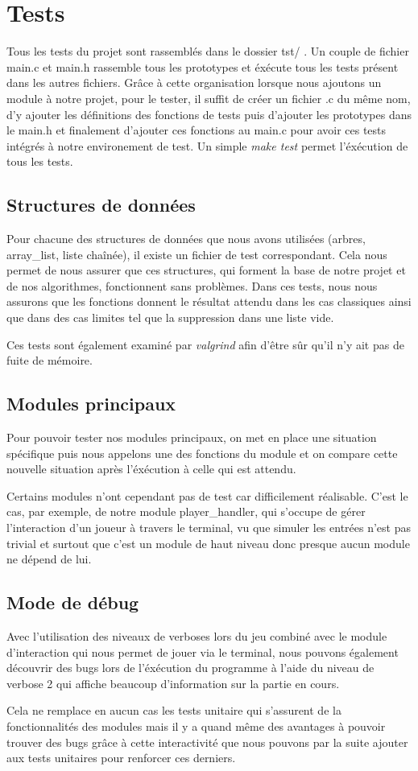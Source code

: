 \section{Tests}

Tous les tests du projet sont rassemblés dans le dossier tst/ . Un couple de fichier main.c et main.h 
rassemble tous les prototypes et éxécute tous les tests présent dans les autres fichiers. Grâce à cette
organisation lorsque nous ajoutons un module à notre projet, pour le tester, il suffit de créer un fichier .c
du même nom, d'y ajouter les définitions des fonctions de tests puis d'ajouter les prototypes dans le main.h et
finalement d'ajouter ces fonctions au main.c pour avoir ces tests intégrés à notre environement de test.
Un simple \emph{make test} permet l'éxécution de tous les tests. 

\subsection{Structures de données}
Pour chacune des structures de données que nous avons utilisées (arbres, array\_list, liste chaînée),
il existe un fichier de test correspondant. Cela nous permet de nous assurer que ces structures, qui
forment la base de notre projet et de nos algorithmes, fonctionnent sans problèmes. Dans ces tests, nous nous assurons que les fonctions
donnent le résultat attendu dans les cas classiques ainsi que dans des cas limites tel que la suppression 
dans une liste vide. 

Ces tests sont également examiné par \emph{valgrind} afin d'être sûr qu'il n'y ait pas 
de fuite de mémoire.

\subsection{Modules principaux}
Pour pouvoir tester nos modules principaux, on met en place une situation spécifique puis nous appelons une des 
fonctions du module et on compare cette nouvelle situation après l'éxécution à celle qui est attendu.

Certains modules n'ont cependant pas de test car difficilement réalisable. C'est le cas, par exemple, de notre
module player\_handler, qui s'occupe de gérer l'interaction d'un joueur à travers le terminal, vu que simuler
les entrées n'est pas trivial et surtout que c'est un module de haut niveau donc presque aucun module ne dépend de lui.

\subsection{Mode de débug}
Avec l'utilisation des niveaux de verboses lors du jeu combiné avec le module d'interaction qui nous permet de jouer via le terminal,
nous pouvons également découvrir des bugs lors de l'éxécution du programme à l'aide du niveau de verbose 2
qui affiche beaucoup d'information sur la partie en cours.
   
Cela ne remplace en aucun cas les tests unitaire qui s'assurent de la fonctionnalités des modules mais 
il y a quand même des avantages à pouvoir trouver des bugs grâce à cette interactivité que nous pouvons
par la suite ajouter aux tests unitaires pour renforcer ces derniers. 

